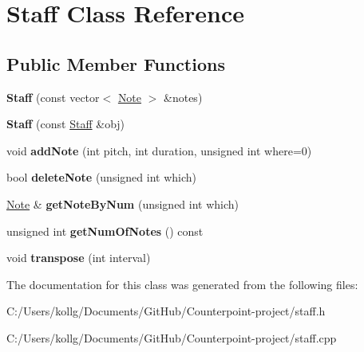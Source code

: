 \hypertarget{class_staff}{}\section{Staff Class Reference}
\label{class_staff}
\subsection*{Public Member Functions}
\begin{DoxyCompactItemize}
\item 
\hypertarget{class_staff_a0d21fcb11e76001f4ecd84e29deff46f}{}{\bfseries Staff} (const vector$<$ \hyperlink{class_note}{Note} $>$ \&notes)\label{class_staff_a0d21fcb11e76001f4ecd84e29deff46f}

\item 
\hypertarget{class_staff_ac0fee1d59feb2dbed7948288f33e5638}{}{\bfseries Staff} (const \hyperlink{class_staff}{Staff} \&obj)\label{class_staff_ac0fee1d59feb2dbed7948288f33e5638}

\item 
\hypertarget{class_staff_ad310fdd73d8b93019886dfb9bae1d0f3}{}void {\bfseries add\+Note} (int pitch, int duration, unsigned int where=0)\label{class_staff_ad310fdd73d8b93019886dfb9bae1d0f3}

\item 
\hypertarget{class_staff_a84311488f013f1ea290e4fbb0e18fa72}{}bool {\bfseries delete\+Note} (unsigned int which)\label{class_staff_a84311488f013f1ea290e4fbb0e18fa72}

\item 
\hypertarget{class_staff_aff07431f7ea2dd8e5c67dd2d96ab9a71}{}\hyperlink{class_note}{Note} \& {\bfseries get\+Note\+By\+Num} (unsigned int which)\label{class_staff_aff07431f7ea2dd8e5c67dd2d96ab9a71}

\item 
\hypertarget{class_staff_ab404828c4ae9da75c5ca37d3eeaa980c}{}unsigned int {\bfseries get\+Num\+Of\+Notes} () const \label{class_staff_ab404828c4ae9da75c5ca37d3eeaa980c}

\item 
\hypertarget{class_staff_acda41e19d6385d0b7c721dc1cc437f66}{}void {\bfseries transpose} (int interval)\label{class_staff_acda41e19d6385d0b7c721dc1cc437f66}

\end{DoxyCompactItemize}


The documentation for this class was generated from the following files\+:\begin{DoxyCompactItemize}
\item 
C\+:/\+Users/kollg/\+Documents/\+Git\+Hub/\+Counterpoint-\/project/staff.\+h\item 
C\+:/\+Users/kollg/\+Documents/\+Git\+Hub/\+Counterpoint-\/project/staff.\+cpp\end{DoxyCompactItemize}

